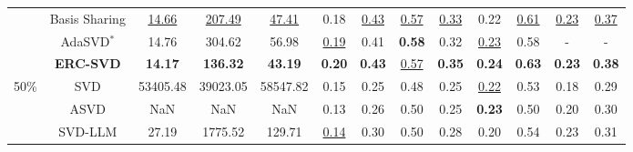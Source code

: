 \begin{table}[t]
{\begin{tabular}{c|c|ccc|cccccccc}
                               & \cellcolor{white} Basis Sharing & \cellcolor{white} \underline{14.66} & \cellcolor{white} \underline{207.49} & \cellcolor{white} \underline{47.41} & \cellcolor{white} 0.18 & \cellcolor{white} \underline{0.43} & \cellcolor{white} \underline{0.57} & \cellcolor{white} \underline{0.33} & \cellcolor{white} 0.22 & \cellcolor{white} \underline{0.61} & \cellcolor{white} \underline{0.23} & \cellcolor{white} \underline{0.37} \\

                               & \cellcolor{white} AdaSVD$^{*}$ & \cellcolor{white} 14.76 & \cellcolor{white} 304.62 & \cellcolor{white} 56.98 & \cellcolor{white} \underline{0.19} & \cellcolor{white} 0.41 & \cellcolor{white} \textbf{0.58} & \cellcolor{white} 0.32 & \cellcolor{white} \underline{0.23} & \cellcolor{white} 0.58 & \cellcolor{white} - & \cellcolor{white} -\\
        \cmidrule{2-13}    
                               & \cellcolor{cyan!10} \textbf{ERC-SVD} & \cellcolor{cyan!10} \textbf{14.17} & \cellcolor{cyan!10} \textbf{136.32} & \cellcolor{cyan!10} \textbf{43.19} & \cellcolor{cyan!10} \textbf{0.20} & \cellcolor{cyan!10} \textbf{0.43} & \cellcolor{cyan!10} \underline{0.57} & \cellcolor{cyan!10} \textbf{0.35} & \cellcolor{cyan!10} \textbf{0.24} & \cellcolor{cyan!10} \textbf{0.63} & \cellcolor{cyan!10} \textbf{0.23} & \cellcolor{cyan!10} \textbf{0.38} \\
    \midrule
        \multirow{6}{*}{50\%}  & \cellcolor{white} SVD & \cellcolor{white} 53405.48 & \cellcolor{white} 39023.05 & \cellcolor{white} 58547.82 & \cellcolor{white} 0.15 & \cellcolor{white} 0.25 & \cellcolor{white} 0.48 & \cellcolor{white} 0.25 & \cellcolor{white} \underline{0.22} & \cellcolor{white} 0.53 & \cellcolor{white} 0.18 & \cellcolor{white} 0.29\\

                               & \cellcolor{white} ASVD & \cellcolor{white} NaN & \cellcolor{white} NaN & \cellcolor{white} NaN & \cellcolor{white} 0.13 & \cellcolor{white} 0.26 & \cellcolor{white} 0.50 & \cellcolor{white} 0.25 & \cellcolor{white} \textbf{0.23} & \cellcolor{white} 0.50 & \cellcolor{white} 0.20 & \cellcolor{white} 0.30\\
              
                               & \cellcolor{white} SVD-LLM & \cellcolor{white} 27.19 & \cellcolor{white} 1775.52 & \cellcolor{white} 129.71 & \cellcolor{white} \underline{0.14} & \cellcolor{white} 0.30 & \cellcolor{white} 0.50 & \cellcolor{white} 0.28 & \cellcolor{white} 0.20 & \cellcolor{white} 0.54 & \cellcolor{white} 0.23 & \cellcolor{white} 0.31\\


\end{tabular}}
\end{table}
